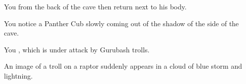 

You  from the back of the cave then return next to his body.


You notice a Panther Cub slowly coming out of the shadow of the side of the cave.




You , which is under attack by Gurubash trolls.




An image of a troll on a raptor suddenly appears in a cloud of blue storm and lightning.








